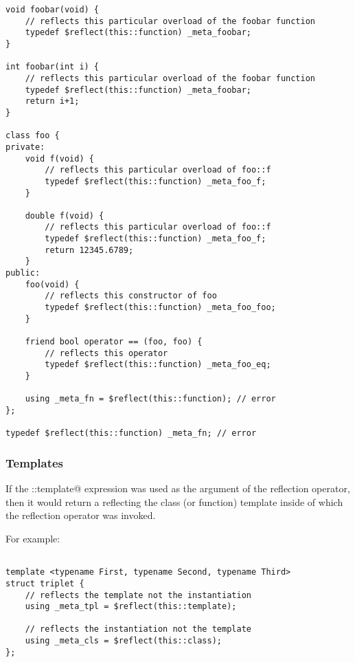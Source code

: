 \begin{verbatim}
void foobar(void) {
	// reflects this particular overload of the foobar function
	typedef $reflect(this::function) _meta_foobar;
}

int foobar(int i) {
	// reflects this particular overload of the foobar function
	typedef $reflect(this::function) _meta_foobar;
	return i+1;
}

class foo {
private:
	void f(void) {
		// reflects this particular overload of foo::f
		typedef $reflect(this::function) _meta_foo_f;
	}

	double f(void) {
		// reflects this particular overload of foo::f
		typedef $reflect(this::function) _meta_foo_f;
		return 12345.6789;
	}
public:
	foo(void) {
		// reflects this constructor of foo
		typedef $reflect(this::function) _meta_foo_foo;
	}

	friend bool operator == (foo, foo) {
		// reflects this operator
		typedef $reflect(this::function) _meta_foo_eq;
	}

	using _meta_fn = $reflect(this::function); // error
};

typedef $reflect(this::function) _meta_fn; // error
\end{verbatim}

\subsubsection{Templates}

If the \verb@this::template@ expression was used as the argument of the reflection
operator, then it would return a  reflecting the class (or function)
template inside of which the reflection operator was invoked.

For example:

\begin{verbatim}

template <typename First, typename Second, typename Third>
struct triplet {
	// reflects the template not the instantiation
	using _meta_tpl = $reflect(this::template);

	// reflects the instantiation not the template
	using _meta_cls = $reflect(this::class);
};
\end{verbatim}
